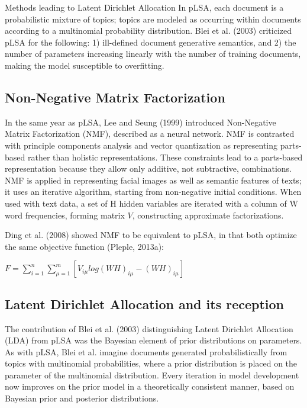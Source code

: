 \documentclass[11pt]{article}
\begin{document}
\begin{section}{Methods leading to Latent Dirichlet Allocation}
In pLSA, each document is a probabilistic mixture of topics; topics are modeled as occurring within documents according to a multinomial probability distribution. Blei et al. (2003) criticized pLSA for the following: 1) ill-defined document generative semantics, and 2) the number of parameters increasing linearly with the number of training documents, making the model susceptible to overfitting.

\subsection{Non-Negative Matrix Factorization}
In the same year as pLSA, Lee and Seung (1999) introduced Non-Negative Matrix Factorization (NMF), described as a neural network. NMF is contrasted with principle components analysis and vector quantization as representing parts-based rather than holistic representations. These constraints lead to a parts-based representation because they allow only additive, not subtractive, combinations. NMF is applied in representing facial images as well as semantic features of texts; it uses an iterative algorithm, starting from non-negative initial conditions. When used with text data, a set of H hidden variables are iterated with a column of W word frequencies, forming matrix $V$, constructing approximate factorizations. 

Ding et al. (2008) showed NMF to be equivalent to pLSA, in that both optimize the same objective function (Pleple, 2013a):
\vspace{0.2cm}
\begin{center}
$F = \sum_{i=1}^{n}\sum_{\mu=1}^{m}[V_{i\mu}log(WH)_{i\mu} - (WH)_{i\mu}]$
\end{center}

\subsection{Latent Dirichlet Allocation and its reception}
The contribution of Blei et al. (2003) distinguishing Latent Dirichlet Allocation (LDA) from pLSA was the Bayesian element of prior distributions on parameters. As with pLSA, Blei et al. imagine documents generated probabilistically from topics with multinomial probabilities, where a prior distribution is placed on the parameter of the multinomial distribution. Every iteration in model development now improves on the prior model in a theoretically consistent manner, based on Bayesian prior and posterior distributions. 


\end{section}
\end{document}

